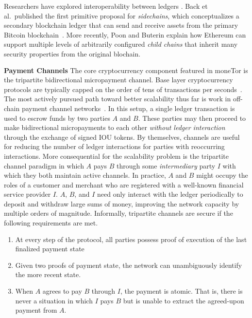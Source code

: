 Researchers have explored interoperability between ledgers . Back et al.\
published the first primitive proposal for \emph{sidechains}, which
conceptualizes a secondary blockchain ledger that can send and receive assets
from the primary Bitcoin blockchain~\cite{back2014enabling}. More recently, Poon
and Buterin explain how Ethereum can support multiple levels of arbitrarily
configured \emph{child chains} that inherit many security properties from the
original blochain.

\textbf{Payment Channels} The core cryptocurrency component featured in moneTor
is the tripartite bidirectional micropayment channel. Base layer cryptocurrency
protocols are typically capped on the order of tens of transactions per
seconds~\cite{team2018blockchain}. The most actively pursued path toward better
scalability thus far is work in off-chain payment channel
networks~\cite{poon2016bitcoin}. In this setup, a single ledger transaction is
used to escrow funds by two parties $A$ and $B$. These parties may then proceed
to make bidirectional micropayments to each other \emph{without ledger
  interaction} through the exchange of signed IOU tokens. By themselves,
channels are useful for reducing the number of ledger interactions for parties
with reoccurring interactions. More consequential for the scalability problem is
the tripartite channel paradigm in which $A$ pays $B$ through some
\emph{intermediary} party $I$ with which they both maintain active channels. In
practice, $A$ and $B$ might occupy the roles of a customer and merchant who are
registered with a well-known financial service provider $I$. $A$, $B$, and $I$
need only interact with the ledger periodically to deposit and withdraw large sums of
money, improving the network capacity by multiple orders of
magnitude. Informally, tripartite channels are secure if the following
requirements are met.

\begin{enumerate}
\item At every step of the protocol, all parties possess proof of execution of
  the last finalized payment state
\item Given two proofs of payment state, the network can unambiguously identify
  the more recent state.
\item When $A$ agrees to pay $B$ through $I$, the payment is atomic. That is,
  there is never a situation in which $I$ pays $B$ but is unable to extract the
  agreed-upon payment from $A$.
\end{enumerate}

